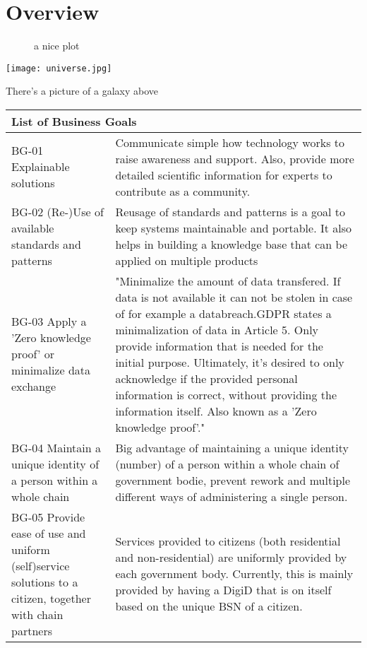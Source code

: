 \chapter{Overview}\label{s:overview}

\graphicspath{ {./images/} }
\begin{figure}[h]
\centering
\caption{a nice plot}
\label{fig:mesh1}
\end{figure}

\texttt{[image: universe.jpg]}

There's a picture of a galaxy above

\begin{tabular}{ |p{5cm}||p{11cm}|}
 \hline
 \multicolumn{2}{|l|}{List of Business Goals} \\
 \hline
 BG-01 Explainable solutions   &   Communicate simple how technology works to raise awareness and support. Also, provide more detailed scientific information for experts to contribute as a community.     \\
 \hline
 BG-02 (Re-)Use of available standards and patterns &  Reusage of standards and patterns is a goal to keep systems maintainable and portable. It also helps in building a knowledge base that can be applied on multiple products \\
  \hline
 BG-03 Apply a 'Zero knowledge proof' or minimalize data exchange & "Minimalize the amount of data transfered. If data is not available it can not be stolen in case of for example a databreach.GDPR states a minimalization of data in Article 5. Only provide information that is needed for the initial purpose.
Ultimately, it's desired to only acknowledge if the provided personal information is correct, without providing the information itself. Also known as a 'Zero knowledge proof'."  \\
  \hline
BG-04 Maintain a unique identity of a person within a whole chain & Big advantage of maintaining a unique identity (number) of a person within a whole chain of government bodie, prevent rework and multiple different ways of administering a single person.  \\
  \hline
 BG-05 Provide ease of use and uniform (self)service solutions to a citizen, together with chain partners &  Services provided to citizens (both residential and non-residential) are uniformly provided by each government body. Currently, this is mainly provided by having a DigiD that is on itself based on the unique BSN of a citizen.\\
\end{tabular}

